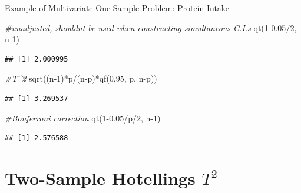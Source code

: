 \documentclass[
  ignorenonframetext,
]{beamer}
\newenvironment{Shaded}{\begin{snugshade}}{\end{snugshade}}
\newcommand{\CommentTok}[1]{\textcolor[rgb]{0.56,0.35,0.01}{\textit{#1}}}
\newcommand{\DecValTok}[1]{\textcolor[rgb]{0.00,0.00,0.81}{#1}}
\newcommand{\FloatTok}[1]{\textcolor[rgb]{0.00,0.00,0.81}{#1}}
\newcommand{\FunctionTok}[1]{\textcolor[rgb]{0.00,0.00,0.00}{#1}}
\newcommand{\NormalTok}[1]{#1}
\newcommand{\SpecialCharTok}[1]{\textcolor[rgb]{0.00,0.00,0.00}{#1}}
\begin{document}
\begin{frame}[fragile]{Example of Multivariate One-Sample Problem:
Protein Intake}
\protect\hypertarget{example-of-multivariate-one-sample-problem-protein-intake-9}{}
\tiny

\begin{Shaded}
\begin{Highlighting}[]
\CommentTok{\#unadjusted, shouldn\textquotesingle{}t be used when constructing simultaneous C.I.s}
\FunctionTok{qt}\NormalTok{(}\DecValTok{1}\FloatTok{{-}0.05}\SpecialCharTok{/}\DecValTok{2}\NormalTok{, n}\DecValTok{{-}1}\NormalTok{)}
\end{Highlighting}
\end{Shaded}

\begin{verbatim}
## [1] 2.000995
\end{verbatim}

\begin{Shaded}
\begin{Highlighting}[]
\CommentTok{\#T\^{}2}
\FunctionTok{sqrt}\NormalTok{((n}\DecValTok{{-}1}\NormalTok{)}\SpecialCharTok{*}\NormalTok{p}\SpecialCharTok{/}\NormalTok{(n}\SpecialCharTok{{-}}\NormalTok{p)}\SpecialCharTok{*}\FunctionTok{qf}\NormalTok{(}\FloatTok{0.95}\NormalTok{, p, n}\SpecialCharTok{{-}}\NormalTok{p))}
\end{Highlighting}
\end{Shaded}

\begin{verbatim}
## [1] 3.269537
\end{verbatim}

\begin{Shaded}
\begin{Highlighting}[]
\CommentTok{\#Bonferroni correction}
\FunctionTok{qt}\NormalTok{(}\DecValTok{1}\FloatTok{{-}0.05}\SpecialCharTok{/}\NormalTok{p}\SpecialCharTok{/}\DecValTok{2}\NormalTok{, n}\DecValTok{{-}1}\NormalTok{)}
\end{Highlighting}
\end{Shaded}

\begin{verbatim}
## [1] 2.576588
\end{verbatim}

\normalsize
\end{frame}

\hypertarget{two-sample-hotellings-t2}{%
\section{\texorpdfstring{Two-Sample Hotellings
\(T^2\)}{Two-Sample Hotellings T\^{}2}}\label{two-sample-hotellings-t2}}
\end{document}
